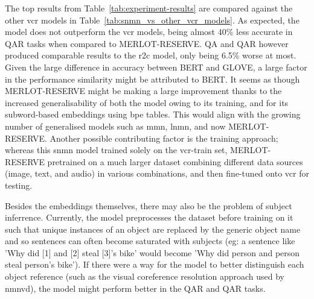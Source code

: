 The top results from Table~\ref{tab:experiment-results} are compared against the other \gls{vcr} models in Table~\ref{tab:snmn_vs_other_vcr_models}.
As expected, the model does not outperform the \gls{vcr} models, being almost 40\% less accurate in Q\rightarrow{}AR tasks when compared to MERLOT-RESERVE.
Q\rightarrow{}A and QA\rightarrow{}R however produced comparable results to the \gls{r2c} model, only being 6.5\% worse at most.
Given the large difference in accuracy between BERT and GLOVE, a large factor in the performance similarity might be attributed to BERT.
It seems as though MERLOT-RESERVE might be making a large improvement thanks to the increased generalisability of both the model owing to its training, and for its subword-based embeddings using \gls{bpe} tables.
This would align with the growing number of generalised models such as \gls{mmn}, \gls{lnmn}, and now MERLOT-RESERVE.
Another possible contributing factor is the training approach; whereas this \gls{snmn} model trained solely on the \gls{vcr}-train set, MERLOT-RESERVE pretrained on a much larger dataset combining different data sources (image, text, and audio) in various combinations, and then fine-tuned onto \gls{vcr} for testing.

Besides the embeddings themselves, there may also be the problem of subject inferrence.
Currently, the model preprocesses the dataset before training on it such that unique instances of an object are replaced by the generic object name and so sentences can often become saturated with subjects (eg: a sentence like 'Why did [1] and [2] steal [3]'s bike' would become 'Why did person and person steal person's bike').
If there were a way for the model to better distinguish each object reference (such as the visual coreference resolution approach used by \gls{nmnvd}\cite{cho_visual_2021}), the model might perform better in the QA\rightarrow{}R and Q\rightarrow{}AR tasks.

